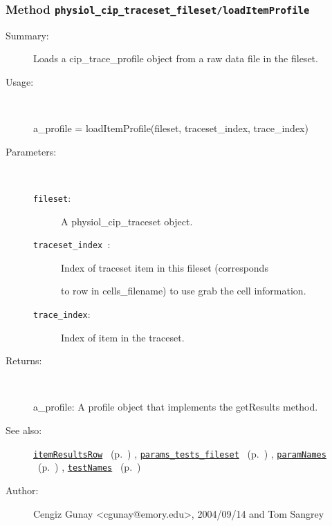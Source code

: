\subsubsection[Method \texttt{loadItemProfile}]{Method \texttt{physiol\_cip\_traceset\_fileset/loadItemProfile}}%
%
\label{ref_physiol_cip_traceset_fileset__loadItemProfile}%
\hypertarget{ref_physiol_cip_traceset_fileset__loadItemProfile}{}%
\begin{description}
\item[Summary:]Loads a cip\_trace\_profile object from a raw data file in the fileset.
%
\item[Usage:]~%
\begin{lyxcode}%
a\_profile = loadItemProfile(fileset, traceset\_index, trace\_index)
%
\end{lyxcode}%
%
%
\item[Parameters:]~
\begin{description}%
\item[\texttt{fileset}:]
     A physiol\_cip\_traceset object.
\item[\texttt{traceset\_index }:]
  Index of traceset item in this fileset (corresponds 

to row in cells\_filename) to use grab the cell information.
\item[\texttt{trace\_index}:]
 Index of item in the traceset.
\end{description}%
%
\item[Returns:
]~

	a\_profile: A profile object that implements the getResults method.
%
%
\item[See also:]%
\hyperlink{ref_itemResultsRow}{\texttt{itemResultsRow}}%
\ (p.~\pageref{ref_itemResultsRow})%
%
, \hyperlink{ref_params_tests_fileset}{\texttt{params\_tests\_fileset}}%
\ (p.~\pageref{ref_params_tests_fileset})%
%
, \hyperlink{ref_paramNames}{\texttt{paramNames}}%
\ (p.~\pageref{ref_paramNames})%
%
, \hyperlink{ref_testNames}{\texttt{testNames}}%
\ (p.~\pageref{ref_testNames})%
%
%
\item[Author:]%
Cengiz Gunay <cgunay@emory.edu>, 2004/09/14 and Tom Sangrey
%
\end{description}
\methodline%
